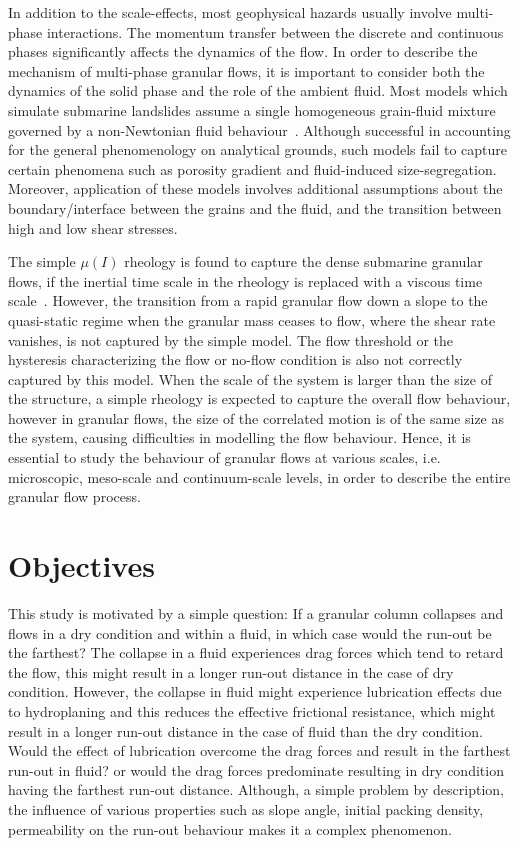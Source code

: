 In addition to the scale-effects, most geophysical hazards usually involve 
multi-phase interactions. The momentum transfer between the discrete and 
continuous phases significantly affects the dynamics of the flow. In order to 
describe the mechanism of multi-phase granular flows, it is important to 
consider both the dynamics of the solid phase and the role of the ambient 
fluid. Most models which simulate submarine landslides assume a single 
homogeneous grain-fluid mixture governed by a non-Newtonian fluid 
behaviour~\citep{Denlinger2001,Iverson2000}. Although successful in accounting 
for the general phenomenology on analytical grounds, such models fail to 
capture certain phenomena such as porosity gradient and fluid-induced 
size-segregation. Moreover, application of these models involves additional 
assumptions about the boundary/interface between the grains and the fluid, and 
the transition between high and low shear stresses. 

The simple $\mu(\textit{I})$ rheology is found to capture the dense submarine 
granular flows, if the inertial time scale in the rheology is replaced with a 
viscous time scale~\citep{Pouliquen2005}. However, the transition from a rapid 
granular flow down a slope to the quasi-static regime when the granular mass 
ceases to flow, where the shear rate vanishes, is not captured by the simple 
model. The flow threshold or the hysteresis characterizing the flow or no-flow 
condition is also not correctly captured by this model. When the scale of the 
system is larger than the size of the structure, a simple rheology is expected 
to capture the overall flow behaviour, however in granular flows, the size of 
the correlated motion is of the same size as the system, causing difficulties 
in modelling the flow behaviour. Hence, it is essential to study the behaviour 
of granular flows at various scales, i.e. microscopic, meso-scale and 
continuum-scale levels, in order to describe the entire granular flow process.


\section{Objectives}

This study is motivated by a simple question: If a granular column collapses 
and flows in a dry condition and within a fluid, in which case would the 
run-out be the farthest? The collapse in a fluid experiences drag forces which 
tend to retard the flow, this might result in a longer run-out distance in the 
case of dry condition. However, the collapse in fluid might experience 
lubrication effects due to hydroplaning and this reduces the effective 
frictional resistance, which might result in a longer run-out distance in the 
case of fluid than the dry condition. Would the effect of lubrication overcome 
the drag forces and result in the farthest run-out in fluid? or would the drag 
forces predominate resulting in dry condition having the farthest run-out 
distance. Although, a simple problem by description, the influence of various 
properties such as slope angle, initial packing density, permeability on the 
run-out behaviour makes it a complex phenomenon.

